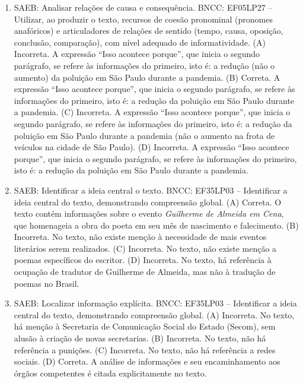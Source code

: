 \begin{enumerate}
\item
SAEB: Analisar relações de causa e consequência. BNCC: EF05LP27 -- Utilizar, ao produzir o texto, recursos de coesão pronominal (pronomes anafóricos) e articuladores de relações de sentido (tempo, causa, oposição, conclusão, comparação), com nível adequado de informatividade. 
(A) Incorreta. A expressão ``Isso acontece porque'', que inicia o segundo parágrafo, se refere às informações do primeiro, isto é: a redução (não o aumento) da poluição em São Paulo durante a pandemia. 
(B) Correta. A expressão ``Isso acontece porque'', que inicia o segundo parágrafo, se refere às informações do primeiro, isto é: a redução da poluição em São Paulo durante a pandemia. 
(C) Incorreta. A expressão ``Isso acontece porque'', que inicia o segundo parágrafo, se refere às informações do primeiro, isto é: a redução da poluição em São Paulo durante a pandemia (não o aumento na frota de veículos na cidade de São Paulo). 
(D) Incorreta. A expressão ``Isso acontece porque'', que inicia o segundo parágrafo, se refere às informações do primeiro, isto é: a redução da poluição em São Paulo durante a pandemia.

\item
SAEB: Identificar a ideia central o texto. BNCC: EF35LP03 -- Identificar a ideia central do texto, demonstrando compreensão global. 
(A) Correta. O texto contém informações sobre o evento \textit{Guilherme de Almeida em Cena}, que homenageia a obra do poeta em seu mês de nascimento e falecimento. 
(B) Incorreta. No texto, não existe menção à necessidade de mais eventos literários serem realizados. 
(C) Incorreta. No texto, não existe menção a poemas específicos do escritor. 
(D) Incorreta. No texto, há referência à ocupação de tradutor de Guilherme de Almeida, mas não à tradução de poemas no Brasil.

\item
SAEB: Localizar informação explícita. BNCC: EF35LP03 -- Identificar a ideia central do texto, demonstrando compreensão global. 
(A) Incorreta. No texto, há menção à Secretaria de Comunicação Social do Estado (Secom), sem alusão à criação de novas secretarias. 
(B) Incorreta. No texto, não há referência a punições. 
(C) Incorreta. No texto, não há referência a redes sociais. 
(D) Correta. A análise de informações e seu encaminhamento aos órgãos competentes é citada explicitamente no texto.


\end{enumerate}
